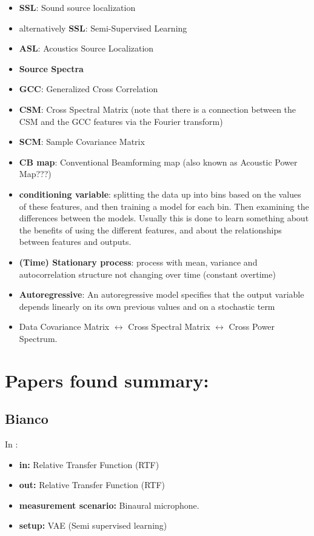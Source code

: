\documentclass{article}
\begin{document}
\begin{itemize}
    \item \textbf{SSL}: Sound source localization
    \item alternatively \textbf{SSL}: Semi-Supervised Learning
    \item \textbf{ASL}: Acoustics Source Localization    
    \item \textbf{Source Spectra}
    \item \textbf{GCC}: Generalized Cross Correlation
    \item \textbf{CSM}: Cross Spectral Matrix (note that there is a connection between the CSM and the GCC features via the Fourier transform)
    \item \textbf{SCM}: Sample Covariance Matrix
    \item \textbf{CB map}: Conventional Beamforming map (also known as Acoustic Power Map???)
    \item \textbf{conditioning variable}: splitting the data up into bins based on the values of these features, and then training a model for each bin. Then examining the differences between the models. Usually this is done to learn something about the benefits of using the different features, and about the relationships between features and outputs.
    \item \textbf{(Time) Stationary process}: process with mean, variance and autocorrelation structure not changing over time (constant overtime)
    \item \textbf{Autoregressive}: An autoregressive model specifies that the output variable depends linearly on its own previous values and on a stochastic term 
    \item Data Covariance Matrix $\leftrightarrow$ Cross Spectral Matrix $\leftrightarrow$ Cross Power Spectrum.
\end{itemize}

\section{Papers found summary:}

\subsection{Bianco}

In \cite{bianco2020semi}:

\begin{itemize} 
    \item \textbf{in:} Relative Transfer Function (RTF)
    \item \textbf{out:} Relative Transfer Function (RTF)
    \item \textbf{measurement scenario:} Binaural microphone.
    \item \textbf{setup:} VAE (Semi supervised learning)
\end{itemize}
\end{document}
